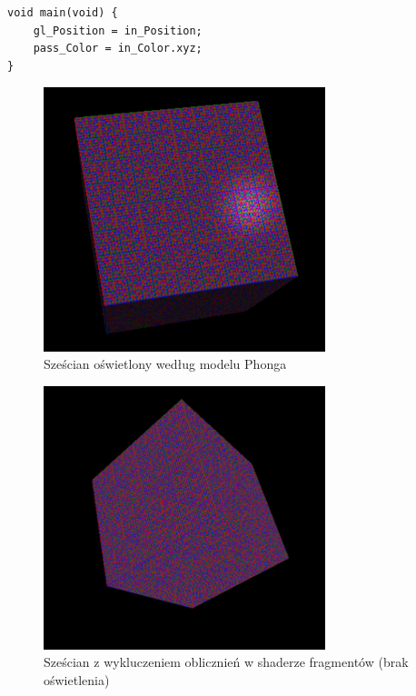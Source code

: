 \documentclass[archive]{mgr}
\begin{document}
\begin{lstlisting}[caption={OpenGL – Vertex Shader – minimalizacja obliczeń},captionpos=b,label={lab:shad8}]
void main(void) {
	gl_Position = in_Position;
	pass_Color = in_Color.xyz;
}
\end{lstlisting}
\begin{figure}[h!]
  \centering
    \includegraphics[width=0.73\textwidth]{images/light.png}
   \caption{Sześcian oświetlony według modelu Phonga}
   \label{lab:light}
\end{figure}
\begin{figure}[h!]
  \centering
    \includegraphics[width=0.73\textwidth]{images/nofrag.png}
   \caption{Sześcian z wykluczeniem oblicznień w shaderze fragmentów (brak oświetlenia)}
   \label{lab:nofrag}
\end{figure}
\end{document}
